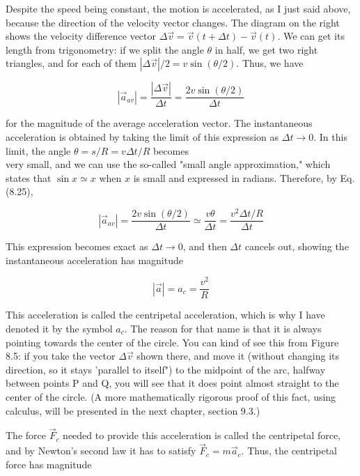 \documentclass[10pt]{article}
\begin{document}
Despite the speed being constant, the motion is accelerated, as I just said above, because the direction of the velocity vector changes. The diagram on the right shows the velocity difference vector $\Delta \vec{v}=\vec{v}(t+\Delta t)-\vec{v}(t)$. We can get its length from trigonometry: if we split the angle $\theta$ in half, we get two right triangles, and for each of them $|\Delta \vec{v}| / 2=v \sin (\theta / 2)$. Thus, we have


\begin{equation*}
\left|\vec{a}_{a v}\right|=\frac{|\Delta \vec{v}|}{\Delta t}=\frac{2 v \sin (\theta / 2)}{\Delta t} \tag{8.25}
\end{equation*}


for the magnitude of the average acceleration vector. The instantaneous acceleration is obtained by taking the limit of this expression as $\Delta t \rightarrow 0$. In this limit, the angle $\theta=s / R=v \Delta t / R$ becomes\\
very small, and we can use the so-called "small angle approximation," which states that $\sin x \simeq x$ when $x$ is small and expressed in radians. Therefore, by Eq. (8.25),


\begin{equation*}
\left|\vec{a}_{a v}\right|=\frac{2 v \sin (\theta / 2)}{\Delta t} \simeq \frac{v \theta}{\Delta t}=\frac{v^{2} \Delta t / R}{\Delta t} \tag{8.26}
\end{equation*}


This expression becomes exact as $\Delta t \rightarrow 0$, and then $\Delta t$ cancels out, showing the instantaneous acceleration has magnitude


\begin{equation*}
|\vec{a}|=a_{c}=\frac{v^{2}}{R} \tag{8.27}
\end{equation*}


This acceleration is called the centripetal acceleration, which is why I have denoted it by the symbol $a_{c}$. The reason for that name is that it is always pointing towards the center of the circle. You can kind of see this from Figure 8.5: if you take the vector $\Delta \vec{v}$ shown there, and move it (without changing its direction, so it stays 'parallel to itself") to the midpoint of the arc, halfway between points P and Q, you will see that it does point almost straight to the center of the circle. (A more mathematically rigorous proof of this fact, using calculus, will be presented in the next chapter, section 9.3.)

The force $\vec{F}_{c}$ needed to provide this acceleration is called the centripetal force, and by Newton's second law it has to satisfy $\vec{F}_{c}=m \vec{a}_{c}$. Thus, the centripetal force has magnitude
\end{document}
